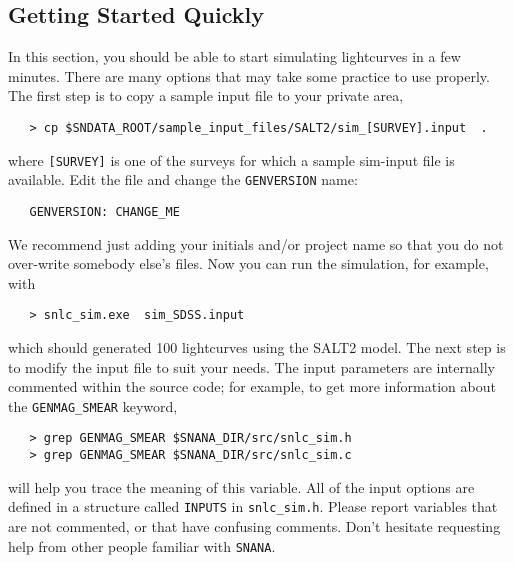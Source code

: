 \documentclass[12pt]{article}
\newcommand{\snana}{{\tt SNANA}}
\begin{document}
{%
   \subsection{Getting Started Quickly }
   \label{subsec:sim_start}

In this section, you should be able to start simulating
lightcurves in a few minutes. There are many options that
may take some practice to use properly.
The first step is to copy a sample input file to your
private area,
\begin{verbatim}
   > cp $SNDATA_ROOT/sample_input_files/SALT2/sim_[SURVEY].input  . 
\end{verbatim}
%
where {\tt [SURVEY]} is one of the surveys for which
a sample sim-input file is available.
Edit the file and change the {\tt GENVERSION} name:
\begin{verbatim}
   GENVERSION: CHANGE_ME
\end{verbatim}
We recommend just adding your initials and/or project name
so that you do not over-write somebody else's files.
Now you can run the simulation, for example, with
%
\begin{verbatim}
   > snlc_sim.exe  sim_SDSS.input
\end{verbatim}
%
which should generated 100 lightcurves using the SALT2 model.
The next step is to modify the input file to suit your needs.
The input parameters are internally commented within the
source code; for example, to get more information about
the {\tt GENMAG\_SMEAR} keyword,
%
\begin{verbatim}
   > grep GENMAG_SMEAR $SNANA_DIR/src/snlc_sim.h
   > grep GENMAG_SMEAR $SNANA_DIR/src/snlc_sim.c
\end{verbatim}
%
will help you trace the meaning of this variable.
All of the input options are defined in a structure
called {\tt INPUTS} in {\tt snlc\_sim.h}.
Please report variables that are not commented, or that
have confusing comments.
Don't hesitate requesting help from other people familiar with \snana.

}
\end{document}
